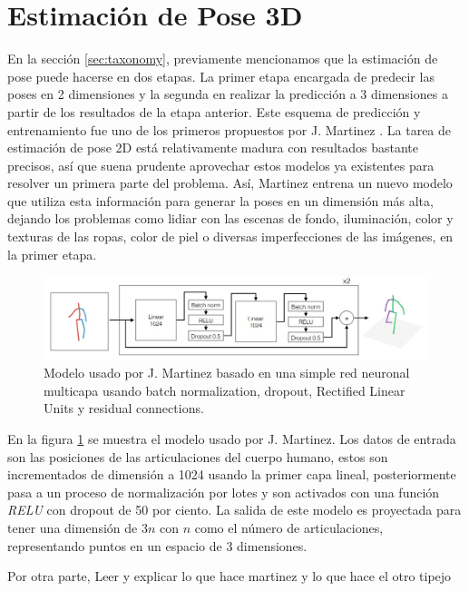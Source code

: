 \section{Estimación de Pose 3D}

En la sección \ref{sec:taxonomy}, previamente mencionamos que la estimación de pose puede hacerse
en dos etapas. La primer etapa encargada de predecir las poses en 2 dimensiones y la segunda en
realizar la predicción a 3 dimensiones a partir de los resultados de la etapa anterior. Este esquema
de predicción y entrenamiento fue uno de los primeros propuestos por J. Martinez
\cite{DBLP:journals/corr/MartinezHRL17}. La tarea de estimación de pose 2D está relativamente madura
con resultados bastante precisos, así que suena prudente aprovechar estos modelos ya existentes para
resolver un primera parte del problema. Así, Martinez entrena un nuevo modelo que utiliza esta
información para generar la poses en un dimensión más alta, dejando los problemas como lidiar con las
escenas de fondo, iluminación, color y texturas de las ropas, color de piel o diversas imperfecciones
de las imágenes, en la primer etapa.

\begin{figure}[!ht]
    \centering
    \includegraphics[width=.9\textwidth]{Chapters/3. Trans-HPE/img/martinez_model.jpeg}
    \caption[2D a 3D model]{Modelo usado por J. Martinez \cite{DBLP:journals/corr/MartinezHRL17}
    basado en una simple red neuronal multicapa usando batch normalization, dropout, Rectified
    Linear Units y residual connections.}
\label{fig:model_martinez}
\end{figure}

En la figura \ref{fig:model_martinez} se muestra el modelo usado por J. Martinez. Los datos de entrada
son las posiciones de las articulaciones del cuerpo humano, estos son incrementados de dimensión a
1024 usando la primer capa lineal, posteriormente pasa a un proceso de normalización por lotes
y son activados con una función \textit{RELU} con dropout de 50 por ciento. La salida de este modelo
es proyectada para tener una dimensión de $3n$ con $n$ como el número de articulaciones, representando
puntos en un espacio de 3 dimensiones.

Por otra parte,
Leer y explicar lo que hace martinez
y lo que hace el otro tipejo

